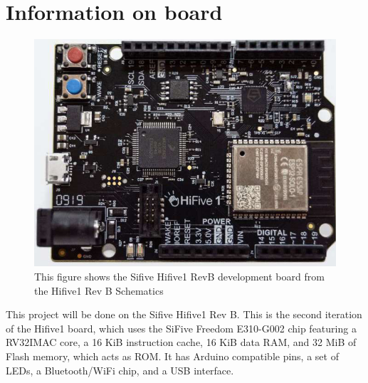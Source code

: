 \section{Information on board}
\begin{figure}[H]
    \includegraphics[width=0.6\columnwidth]{figures/board_image.png}
    \centering
    \caption[Sifive Hifive1 RevB]{This figure shows the Sifive Hifive1 RevB development board from the Hifive1 Rev B Schematics\cite{sifive_schematics}}
\end{figure}
This project will be done on the Sifive Hifive1 Rev B. This is the second iteration of the Hifive1 board, which uses the SiFive Freedom E310-G002 chip featuring a RV32IMAC core, a 16 KiB instruction cache, 16 KiB data RAM, and 32 MiB of Flash memory, which acts as ROM. It has Arduino compatible pins, a set of LEDs, a Bluetooth/WiFi chip, and a USB interface\cite{sifive_manual}.